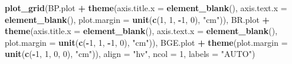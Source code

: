 \documentclass[]{article}
\newenvironment{Shaded}{\begin{snugshade}}{\end{snugshade}}
\newcommand{\KeywordTok}[1]{\textcolor[rgb]{0.13,0.29,0.53}{\textbf{#1}}}
\newcommand{\DataTypeTok}[1]{\textcolor[rgb]{0.13,0.29,0.53}{#1}}
\newcommand{\DecValTok}[1]{\textcolor[rgb]{0.00,0.00,0.81}{#1}}
\newcommand{\StringTok}[1]{\textcolor[rgb]{0.31,0.60,0.02}{#1}}
\newcommand{\OperatorTok}[1]{\textcolor[rgb]{0.81,0.36,0.00}{\textbf{#1}}}
\newcommand{\NormalTok}[1]{#1}
\begin{document}
\begin{Shaded}
\begin{Highlighting}[]
\KeywordTok{plot_grid}\NormalTok{(BP.plot }\OperatorTok{+}\StringTok{ }\KeywordTok{theme}\NormalTok{(}\DataTypeTok{axis.title.x =} \KeywordTok{element_blank}\NormalTok{(), }\DataTypeTok{axis.text.x =} \KeywordTok{element_blank}\NormalTok{(), }
                          \DataTypeTok{plot.margin =} \KeywordTok{unit}\NormalTok{(}\KeywordTok{c}\NormalTok{(}\DecValTok{1}\NormalTok{, }\DecValTok{1}\NormalTok{, }\OperatorTok{-}\DecValTok{1}\NormalTok{, }\DecValTok{0}\NormalTok{), }\StringTok{"cm"}\NormalTok{)), }
\NormalTok{          BR.plot }\OperatorTok{+}\StringTok{ }\KeywordTok{theme}\NormalTok{(}\DataTypeTok{axis.title.x =} \KeywordTok{element_blank}\NormalTok{(), }\DataTypeTok{axis.text.x =} \KeywordTok{element_blank}\NormalTok{(),}
                          \DataTypeTok{plot.margin =} \KeywordTok{unit}\NormalTok{(}\KeywordTok{c}\NormalTok{(}\OperatorTok{-}\DecValTok{1}\NormalTok{, }\DecValTok{1}\NormalTok{, }\OperatorTok{-}\DecValTok{1}\NormalTok{, }\DecValTok{0}\NormalTok{), }\StringTok{"cm"}\NormalTok{)), }
\NormalTok{          BGE.plot }\OperatorTok{+}\StringTok{ }\KeywordTok{theme}\NormalTok{(}\DataTypeTok{plot.margin =} \KeywordTok{unit}\NormalTok{(}\KeywordTok{c}\NormalTok{(}\OperatorTok{-}\DecValTok{1}\NormalTok{, }\DecValTok{1}\NormalTok{, }\DecValTok{0}\NormalTok{, }\DecValTok{0}\NormalTok{), }\StringTok{"cm"}\NormalTok{)), }
          \DataTypeTok{align =} \StringTok{"hv"}\NormalTok{, }\DataTypeTok{ncol =} \DecValTok{1}\NormalTok{, }\DataTypeTok{labels =} \StringTok{"AUTO"}\NormalTok{)}
\end{Highlighting}
\end{Shaded}
\end{document}
